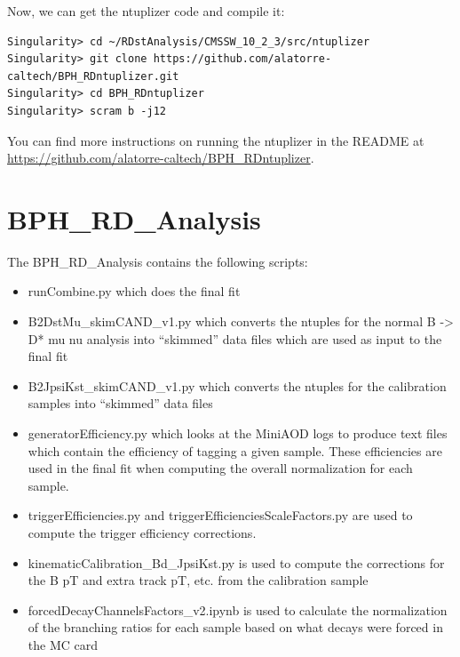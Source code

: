 \documentclass[12pt]{report}
\begin{document}
Now, we can get the ntuplizer code and compile it:
\begin{mdframed}[backgroundcolor=light-gray, roundcorner=10pt,leftmargin=1, rightmargin=1, innerleftmargin=15, innertopmargin=15,innerbottommargin=15, outerlinewidth=1, linecolor=light-gray,roundcorner=20pt]
\begin{lstlisting}
Singularity> cd ~/RDstAnalysis/CMSSW_10_2_3/src/ntuplizer
Singularity> git clone https://github.com/alatorre-caltech/BPH_RDntuplizer.git
Singularity> cd BPH_RDntuplizer
Singularity> scram b -j12
\end{lstlisting}
\end{mdframed}

You can find more instructions on running the ntuplizer in the README at \url{https://github.com/alatorre-caltech/BPH_RDntuplizer}.

\section{BPH\_RD\_Analysis}
The BPH\_RD\_Analysis contains the following scripts:
\begin{itemize}
\item runCombine.py which does the final fit
\item B2DstMu\_skimCAND\_v1.py which converts the ntuples for the normal B -> D* mu nu analysis into ``skimmed'' data files which are used as input to the final fit
\item B2JpsiKst\_skimCAND\_v1.py which converts the ntuples for the calibration samples into ``skimmed'' data files
\item generatorEfficiency.py which looks at the MiniAOD logs to produce text files which contain the efficiency of tagging a given sample. These efficiencies are used in the final fit when computing the overall normalization for each sample.
\item triggerEfficiencies.py and triggerEfficienciesScaleFactors.py are used to compute the trigger efficiency corrections.
\item kinematicCalibration\_Bd\_JpsiKst.py is used to compute the corrections for the B pT and extra track pT, etc. from the calibration sample
\item forcedDecayChannelsFactors\_v2.ipynb is used to calculate the normalization of the branching ratios for each sample based on what decays were forced in the MC card
\end{itemize}
\end{document}
